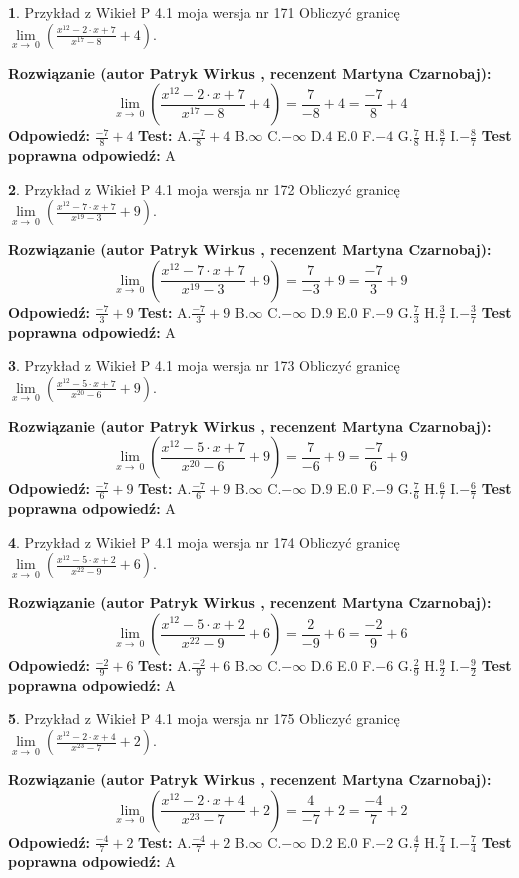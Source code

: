 \documentclass[12pt, a4paper]{article}
\theoremstyle{definition} %
\newtheorem{zad}{}
\newcommand{\zadStart}[1]{\begin{zad}#1\newline}
\newcommand{\zadStop}{\end{zad}}
\newcommand{\rozwStart}[2]{\noindent \textbf{Rozwiązanie (autor #1 , recenzent #2): }\newline}
\newcommand{\rozwStop}{\newline}
\newcommand{\odpStart}{\noindent \textbf{Odpowiedź:}\newline}
\newcommand{\odpStop}{\newline}
\newcommand{\testStart}{\noindent \textbf{Test:}\newline}
\newcommand{\testStop}{\newline}
\newcommand{\kluczStart}{\noindent \textbf{Test poprawna odpowiedź:}\newline}
\newcommand{\kluczStop}{\newline}
\begin{document}
\zadStart{Przykład z Wikieł P 4.1 moja wersja nr 171}
Obliczyć granicę $\lim\limits_{x\to\ 0}(\frac{x^{12}-2 \cdot x +7}{x^{17}-8}+4)$.
\zadStop
\rozwStart{Patryk Wirkus}{Martyna Czarnobaj}
$$\lim\limits_{x\to\ 0}(\frac{x^{12}-2 \cdot x +7}{x^{17}-8}+4)=\frac{7}{-8}+4=\frac{-7}{8}+4$$
\rozwStop
\odpStart
$\frac{-7}{8}+4$
\odpStop
\testStart
A.$\frac{-7}{8}+4$
B.$\infty$
C.$-\infty$
D.$4$
E.$0$
F.$-4$
G.$\frac{7}{8}$
H.$\frac{8}{7}$
I.$-\frac{8}{7}$
\testStop
\kluczStart
A
\kluczStop



\zadStart{Przykład z Wikieł P 4.1 moja wersja nr 172}
Obliczyć granicę $\lim\limits_{x\to\ 0}(\frac{x^{12}-7 \cdot x +7}{x^{19}-3}+9)$.
\zadStop
\rozwStart{Patryk Wirkus}{Martyna Czarnobaj}
$$\lim\limits_{x\to\ 0}(\frac{x^{12}-7 \cdot x +7}{x^{19}-3}+9)=\frac{7}{-3}+9=\frac{-7}{3}+9$$
\rozwStop
\odpStart
$\frac{-7}{3}+9$
\odpStop
\testStart
A.$\frac{-7}{3}+9$
B.$\infty$
C.$-\infty$
D.$9$
E.$0$
F.$-9$
G.$\frac{7}{3}$
H.$\frac{3}{7}$
I.$-\frac{3}{7}$
\testStop
\kluczStart
A
\kluczStop



\zadStart{Przykład z Wikieł P 4.1 moja wersja nr 173}
Obliczyć granicę $\lim\limits_{x\to\ 0}(\frac{x^{12}-5 \cdot x +7}{x^{20}-6}+9)$.
\zadStop
\rozwStart{Patryk Wirkus}{Martyna Czarnobaj}
$$\lim\limits_{x\to\ 0}(\frac{x^{12}-5 \cdot x +7}{x^{20}-6}+9)=\frac{7}{-6}+9=\frac{-7}{6}+9$$
\rozwStop
\odpStart
$\frac{-7}{6}+9$
\odpStop
\testStart
A.$\frac{-7}{6}+9$
B.$\infty$
C.$-\infty$
D.$9$
E.$0$
F.$-9$
G.$\frac{7}{6}$
H.$\frac{6}{7}$
I.$-\frac{6}{7}$
\testStop
\kluczStart
A
\kluczStop



\zadStart{Przykład z Wikieł P 4.1 moja wersja nr 174}
Obliczyć granicę $\lim\limits_{x\to\ 0}(\frac{x^{12}-5 \cdot x +2}{x^{22}-9}+6)$.
\zadStop
\rozwStart{Patryk Wirkus}{Martyna Czarnobaj}
$$\lim\limits_{x\to\ 0}(\frac{x^{12}-5 \cdot x +2}{x^{22}-9}+6)=\frac{2}{-9}+6=\frac{-2}{9}+6$$
\rozwStop
\odpStart
$\frac{-2}{9}+6$
\odpStop
\testStart
A.$\frac{-2}{9}+6$
B.$\infty$
C.$-\infty$
D.$6$
E.$0$
F.$-6$
G.$\frac{2}{9}$
H.$\frac{9}{2}$
I.$-\frac{9}{2}$
\testStop
\kluczStart
A
\kluczStop



\zadStart{Przykład z Wikieł P 4.1 moja wersja nr 175}
Obliczyć granicę $\lim\limits_{x\to\ 0}(\frac{x^{12}-2 \cdot x +4}{x^{23}-7}+2)$.
\zadStop
\rozwStart{Patryk Wirkus}{Martyna Czarnobaj}
$$\lim\limits_{x\to\ 0}(\frac{x^{12}-2 \cdot x +4}{x^{23}-7}+2)=\frac{4}{-7}+2=\frac{-4}{7}+2$$
\rozwStop
\odpStart
$\frac{-4}{7}+2$
\odpStop
\testStart
A.$\frac{-4}{7}+2$
B.$\infty$
C.$-\infty$
D.$2$
E.$0$
F.$-2$
G.$\frac{4}{7}$
H.$\frac{7}{4}$
I.$-\frac{7}{4}$
\testStop
\kluczStart
A
\kluczStop
\end{document}
